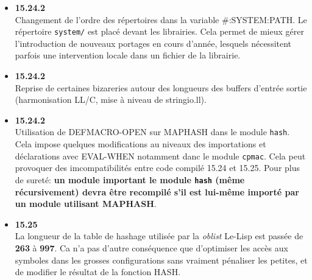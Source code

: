 \begin {enumerate}
\begin {itemize}
\begin {enumerate}
\item {\bf 15.25} \\
la fonction CONTROL-FILE-PATHNAME est revue et corrig\'{e}e afin de
rendre les valeurs ad\'{e}quates, selon le produit nomm\'{e} et le syst\`{e}me
utilis\'{e}. 
L'algorithme de nommage du fichier d'initialisation d'un produit {\tt
toto} est le suivant, selon le syst\`{e}me d'exploitation:
\begin{itemize}
\item os2: {\tt \$HOME\|\|toto.ini}
\item unix: {\tt \$HOME/.toto}
\item vaxvms: {\tt sys\$login:.toto}
\end {itemize}
Dans tous les cas, le deuxi\`{e}me argument \'{e}ventuellement fourni \`{a} la
fonction CONTROL-FILE-PATHNAME permet de remplacer ce nom par d\'{e}faut. 

\end{enumerate}

\item {\bf 15.24.2} \\
Changement de l'ordre des r\'{e}pertoires dans la variable
\#:SYSTEM:PATH.
Le r\'{e}pertoire {\tt system/} est plac\'{e} devant les librairies.
Cela permet de mieux g\'{e}rer l'introduction de nouveaux portages en
cours d'ann\'{e}e, lesquels n\'{e}cessitent parfois une intervention locale dans
un fichier de la librairie. 

\item {\bf 15.24.2} \\
Reprise de certaines bizareries autour des longueurs des buffers
d'entr\'{e}e sortie (harmonisation LL/C, mise \`{a} niveau de stringio.ll).

\item {\bf 15.24.2} \\
Utilisation de DEFMACRO-OPEN sur MAPHASH dans le module {\tt hash}.
Cela impose quelques modifications au niveaux des importations et
d\'{e}clarations avec EVAL-WHEN notamment danc le module {\tt cpmac}.
Cela peut provoquer des imcompatibilit\'{e}s entre code compil\'{e} 15.24
et 15.25. Pour plus de suret\'{e}: {\bf un module important le module
{\tt hash} (m\^{e}me r\'{e}cursivement) devra \^{e}tre recompil\'{e} s'il est
lui-m\^{e}me import\'{e} par un module utilisant MAPHASH}.

\item {\bf 15.25} \\
La longueur de la table de hashage utilis\'{e}e par la {\it oblist}
Le-Lisp est pass\'{e}e de {\bf 263} \`{a} {\bf 997}. Ca n'a pas d'autre
cons\'{e}quence que d'optimiser les acc\`{e}s aux symboles dans les
grosses configurations sans vraiment p\'{e}naliser les petites, et de
modifier le r\'{e}sultat de la fonction 
HASH.


\end{itemize}
\end{enumerate}
